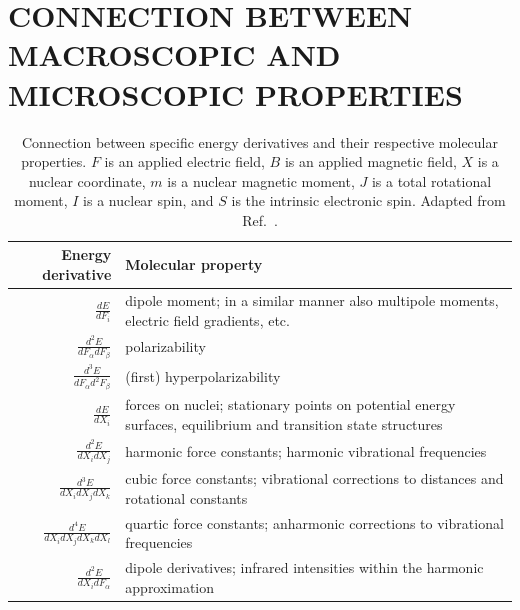 \documentclass[%
class = book,%
crop = false,%
float = true,%
multi = true,%
preview = false,%
]{standalone}
\newcommand{\caps}[1]{\uppercase{#1}}
\begin{document}
\section[Macroscopic and microscopic response connections]{\texorpdfstring{\caps{Connection between macroscopic and microscopic properties}}{Connection between macroscopic and microscopic properties}}
\label{sec:connection-between-macroscopic-and-microscopic}

\begin{table}
  \centering
  \caption[Connection between specific energy derivatives and their respective molecular properties]{Connection between specific energy derivatives and their respective molecular properties. \(F\) is an applied electric field, \(B\) is an applied magnetic field, \(X\) is a nuclear coordinate, \(m\) is a nuclear magnetic moment, \(J\) is a total rotational moment, \(I\) is a nuclear spin, and \(S\) is the intrinsic electronic spin. Adapted from Ref.~\parencite{gauss2000}.\label{tab:gauss}}
  \begin{singlespace}
    \begin{tabulary}{0.85\textwidth}{rL}
      \toprule
      \textbf{Energy derivative} & \textbf{Molecular property} \\
      \midrule
      \(\frac{dE}{dF_{i}}\)                          & dipole moment; in a similar manner also multipole moments, electric field gradients, etc. \\
      \(\frac{d^{2}E}{dF_{\alpha}dF_{\beta}}\)       & polarizability \\
      \(\frac{d^{3}E}{dF_{\alpha}d^{2}F_{\beta}}\)   & (first) hyperpolarizability \\
      \(\frac{dE}{dX_{i}}\)                          & forces on nuclei; stationary points on potential energy surfaces, equilibrium and transition state structures \\
      \(\frac{d^{2}E}{dX_{i}dX_{j}}\)                & harmonic force constants; harmonic vibrational frequencies \\
      \(\frac{d^{3}E}{dX_{i}dX_{j}dX_{k}}\)          & cubic force constants; vibrational corrections to distances and rotational constants \\
      \(\frac{d^{4}E}{dX_{i}dX_{j}dX_{k}dX_{l}}\)    & quartic force constants; anharmonic corrections to vibrational frequencies \\
      \(\frac{d^{2}E}{dX_{i}dF_{\alpha}}\)           & dipole derivatives; infrared intensities within the harmonic approximation \\

\end{tabulary}
\end{singlespace}
\end{table}
\end{document}
